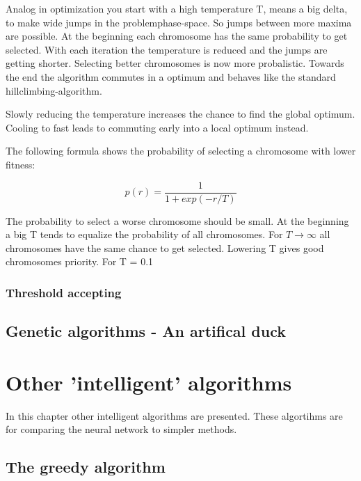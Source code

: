 \documentclass[10pt,a4paper,DIV=11]{scrreprt}
\begin{document}
Analog in optimization you start with a high temperature T, means a big delta, to make wide jumps in the problemphase-space. So jumps between more maxima are possible. At the beginning each chromosome has the same probability to get selected. With each iteration the temperature is reduced and the jumps are getting shorter. Selecting better chromosomes is now more probalistic.
Towards the end the algorithm commutes in a optimum and behaves like the standard hillclimbing-algorithm.

Slowly reducing the temperature increases the chance to find the global optimum. Cooling to fast leads to commuting early into a local optimum instead.

The following formula shows the probability of selecting a chromosome with lower fitness:

\begin{equation}
p(r) = \frac{1}{1+exp(-r/T)}
\end{equation} 

The probability to select a worse chromosome should be small.
At the beginning a big T tends to equalize the probability of all chromosomes. For $T \to \infty$ all chromosomes have the same chance to get selected. Lowering T gives good chromosomes priority. For T = 0.1

\subsection{Threshold accepting}

\section{Genetic algorithms - An artifical duck}

\section{}

\chapter{Other 'intelligent' algorithms}
In this chapter other intelligent algorithms are presented.
These algortihms are for comparing the neural network to simpler
methods.

\section{The greedy algorithm}
\end{document}
